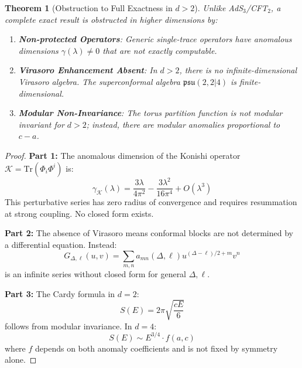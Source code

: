 \documentclass[12pt,a4paper]{article}
\newtheorem{theorem}{Theorem}[section]
\begin{document}
\begin{theorem}[Obstruction to Full Exactness in $d > 2$]\label{thm:ads5-obstruction}
Unlike AdS$_3$/CFT$_2$, a \emph{complete} exact result is obstructed in higher dimensions by:
\begin{enumerate}
    \item \textbf{Non-protected Operators}: Generic single-trace operators have anomalous dimensions $\gamma(\lambda) \neq 0$ that are not exactly computable.
    
    \item \textbf{Virasoro Enhancement Absent}: In $d > 2$, there is no infinite-dimensional Virasoro algebra. The superconformal algebra $\mathfrak{psu}(2,2|4)$ is finite-dimensional.
    
    \item \textbf{Modular Non-Invariance}: The torus partition function is not modular invariant for $d > 2$; instead, there are modular anomalies proportional to $c - a$.
\end{enumerate}
\end{theorem}

\begin{proof}
\textbf{Part 1:} The anomalous dimension of the Konishi operator $\mathcal{K} = \text{Tr}(\Phi_i \Phi^i)$ is:
\begin{equation}
\gamma_{\mathcal{K}}(\lambda) = \frac{3\lambda}{4\pi^2} - \frac{3\lambda^2}{16\pi^4} + O(\lambda^3)
\end{equation}
This perturbative series has zero radius of convergence and requires resummation at strong coupling. No closed form exists.

\textbf{Part 2:} The absence of Virasoro means conformal blocks are not determined by a differential equation. Instead:
\begin{equation}
G_{\Delta,\ell}(u,v) = \sum_{m,n} a_{mn}(\Delta,\ell) u^{(\Delta-\ell)/2 + m} v^n
\end{equation}
is an infinite series without closed form for general $\Delta, \ell$.

\textbf{Part 3:} The Cardy formula in $d = 2$:
\begin{equation}
S(E) = 2\pi\sqrt{\frac{cE}{6}}
\end{equation}
follows from modular invariance. In $d = 4$:
\begin{equation}
S(E) \sim E^{3/4} \cdot f(a,c)
\end{equation}
where $f$ depends on both anomaly coefficients and is not fixed by symmetry alone.
\end{proof}
\end{document}
